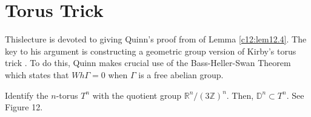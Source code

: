 \chapter{Torus Trick}\label{c13}

This\pageoriginale lecture is devoted to giving Quinn's proof from
\cite{84} of Lemma \ref{c12:lem12.4}. The key to his argument is
constructing a geometric group version of Kirby's torus trick
\cite{66}. To do this, Quinn makes crucial use of the Bass-Heller-Swan
Theorem \cite{5} which states that $Wh \Gamma =0$ when $\Gamma$ is a
free abelian group.

Identify the $n$-torus $T^n$ with the quotient group
$\mathbb{R}^n/(3\mathbb{Z})^n$. Then, $\mathbb{D}^n \subset T^n$. See
Figure 12.
\begin{figure}[H]
\end{figure}

